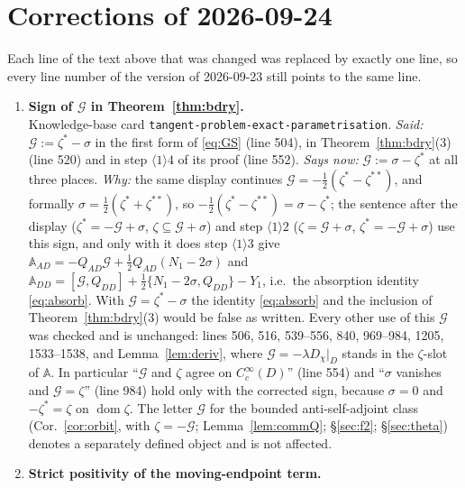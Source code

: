 \documentclass[11pt]{article}
\newcommand{\Aop}{\mathbb A}
\begin{document}
\section{Corrections of 2026-09-24}\label{corr0924:sec}
Each line of the text above that was changed was replaced by exactly one line, so every line
number of the version of 2026-09-23 still points to the same line.
%
\begin{enumerate}[label=C\arabic*,ref=C\arabic*,leftmargin=2.4em,itemsep=3pt]
\item\label{corr0924:C1} \textbf{Sign of $\mathcal G$ in Theorem~\ref{thm:bdry}.}\\
 Knowledge-base card \texttt{tangent-problem-exact-parametrisation}.
 \emph{Said:} $\mathcal G:=\zeta^*-\sigma$ in the first form of \eqref{eq:GS} (line 504), in
 Theorem~\ref{thm:bdry}(3) (line 520) and in step $\langle1\rangle4$ of its proof (line 552).
 \emph{Says now:} $\mathcal G:=\sigma-\zeta^*$ at all three places.
 \emph{Why:} the same display continues $\mathcal G=-\frac12(\zeta^*-\zeta^{**})$, and
 formally $\sigma=\frac12(\zeta^*+\zeta^{**})$, so $-\frac12(\zeta^*-\zeta^{**})=\sigma-\zeta^*$;
 the sentence after the display ($\zeta^*=-\mathcal G+\sigma$, $\zeta\subseteq\mathcal G+\sigma$)
 and step $\langle1\rangle2$ ($\zeta=\mathcal G+\sigma$, $\zeta^*=-\mathcal G+\sigma$) use this
 sign, and only with it does step $\langle1\rangle3$ give
 $\Aop_{AD}=-Q_{AD}\mathcal G+\frac12Q_{AD}(N_1-2\sigma)$ and
 $\Aop_{DD}=[\mathcal G,Q_{DD}]+\frac12\{N_1-2\sigma,Q_{DD}\}-Y_1$, i.e.\ the absorption
 identity \eqref{eq:absorb}.  With $\mathcal G=\zeta^*-\sigma$ the identity \eqref{eq:absorb}
 and the inclusion of Theorem~\ref{thm:bdry}(3) would be false as written.  Every other use of this $\mathcal G$ was
 checked and is unchanged: lines 506, 516, 539--556, 840, 969--984, 1205, 1533--1538, and
 Lemma~\ref{lem:deriv}, where $\mathcal G=-\lambda D_\chi|_D$ stands in the $\zeta$-slot of
 $\Aop$.  In particular ``$\mathcal G$ and $\zeta$ agree on $C_c^\infty(D)$'' (line 554) and
 ``$\sigma$ vanishes and $\mathcal G=\zeta$'' (line 984) hold only with the corrected sign,
 because $\sigma=0$ and $-\zeta^*=\zeta$ on $\operatorname{dom}\zeta$.  The letter
 $\mathcal G$ for the bounded anti-self-adjoint class (Cor.~\ref{cor:orbit}, with
 $\zeta=-\mathcal G$; Lemma~\ref{lem:commQ}; \S\ref{sec:f2}; \S\ref{sec:theta}) denotes a
 separately defined object and is not affected.
\item\label{corr0924:C2} \textbf{Strict positivity of the moving-endpoint term.}\\

\end{enumerate}
\end{document}
